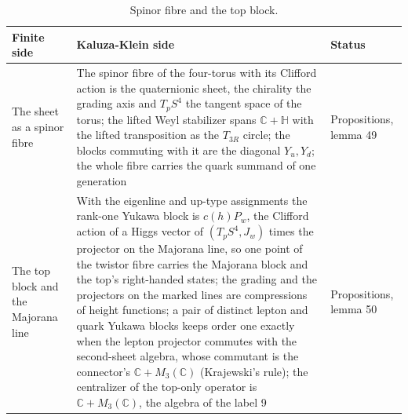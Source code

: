 \documentclass[aps,prd,reprint,onecolumn,nofootinbib,amsmath,amssymb,floatfix]{revtex4-2}
\theoremstyle{plain}
\begin{document}
\begin{table}
\caption{\label{tab:top}Spinor fibre and the top block.}
\setlength{\tabcolsep}{0.01\textwidth}
\begin{ruledtabular}
\begin{tabular}{p{}p{}p{}}
Finite side&Kaluza-Klein side&Status\\
\hline
The sheet as a spinor fibre&The spinor fibre of the four-torus with its Clifford action is the quaternionic sheet, the chirality the grading axis and $T_pS^4$ the tangent space of the torus; the lifted Weyl stabilizer spans $\mathbb C+\mathbb H$ with the lifted transposition as the $T_{3R}$ circle; the blocks commuting with it are the diagonal $Y_u,Y_d$; the whole fibre carries the quark summand of one generation&Propositions, lemma 49\\
The top block and the Majorana line&With the eigenline and up-type assignments the rank-one Yukawa block is $c(h)P_w$, the Clifford action of a Higgs vector of $(T_pS^4,J_w)$ times the projector on the Majorana line, so one point of the twistor fibre carries the Majorana block and the top's right-handed states; the grading and the projectors on the marked lines are compressions of height functions; a pair of distinct lepton and quark Yukawa blocks keeps order one exactly when the lepton projector commutes with the second-sheet algebra, whose commutant is the connector's $\mathbb C+M_3(\mathbb C)$ (Krajewski's rule); the centralizer of the top-only operator is $\mathbb C+M_3(\mathbb C)$, the algebra of the label 9&Propositions, lemma 50\\
\end{tabular}
\end{ruledtabular}
\end{table}
\end{document}
